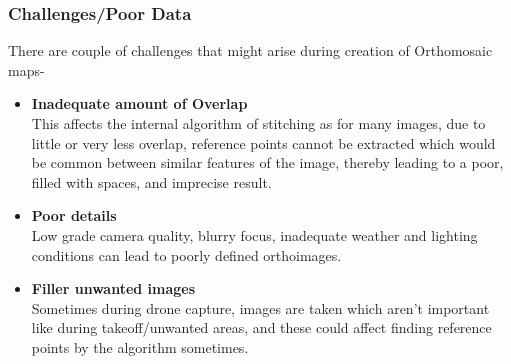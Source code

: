 \documentclass[11pt,twocolumn,letterpaper]{article}
\begin{document}
\subsubsection{Challenges/Poor Data}
There are couple of challenges that might arise during creation of Orthomosaic maps-

\begin{itemize}
    \item \textbf{ Inadequate amount of Overlap }
    \\ This affects the internal algorithm of stitching as for many images, due to little or very less overlap, reference points cannot be extracted which would be common between similar features of the image, thereby leading to a poor, filled with spaces, and imprecise result. 
    \item \textbf{Poor details}
    \\ Low grade camera quality, blurry focus, inadequate weather and lighting conditions can lead to poorly defined orthoimages. 
    \item \textbf{ Filler unwanted images}
    \\Sometimes during drone capture, images are taken which aren't important like during takeoff/unwanted areas, and these could affect finding reference points by the algorithm sometimes.
\end{itemize}
\end{document}
